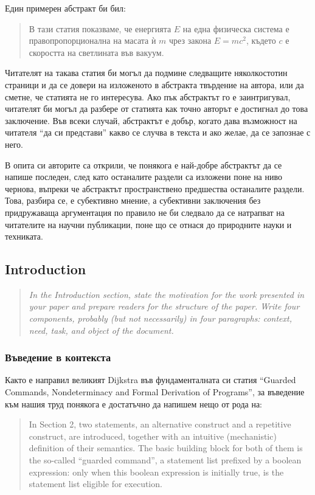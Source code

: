 \documentclass[11pt, oneside]{article}     %
\newenvironment{quotenature}{\begin{quote}\itshape}{\cite{nature}\end{quote}}
\begin{document}
Един примерен абстракт би бил:
\begin{quote}
  В тази статия показваме, че енергията $E$ на една физическа система е правопропорционална на масата ѝ $m$ чрез закона $E=mc^2$, където $c$ е скоростта на светлината във вакуум.
\end{quote}
Читателят на такава статия би могъл да подмине следващите няколкостотин страници и да се довери на изложеното в абстракта твърдение на автора, или да сметне, че статията не го интересува. Ако пък абстрактът го е заинтригувал, читателят би могъл да разбере от статията как точно авторът е достигнал до това заключение. Във всеки случай, абстрактът е добър, когато дава възможност на читателя ``да си представи'' какво се случва в текста и ако желае, да се запознае с него.

В опита си авторите са открили, че понякога е най-добре абстрактът да се напише последен, след като останалите раздели са изложени поне на ниво чернова, въпреки че абстрактът пространствено предшества останалите раздели. Това, разбира се, е субективно мнение, а субективни заключения без придружаваща аргументация по правило не би следвало да се натрапват на читателите на научни публикации, поне що се отнася до природните науки и техниката.

\subsection*{Introduction}

\begin{quotenature}
  In the Introduction section, state the motivation for the work presented in your paper and prepare readers for the structure of the paper. Write four components, probably (but not necessarily) in four paragraphs: context, need, task, and object of the document.
\end{quotenature}

\subsubsection*{Въведение в контекста}

Както е направил великият Dijkstra във фундаменталната си статия ``Guarded Commands, Nondeterminacy and Formal Derivation of Programs'', за въведение към нашия труд понякога е достатъчно да напишем нещо от рода на:
\begin{quote}
  In Section 2, two statements, an alternative construct and a repetitive construct, are introduced, together with an intuitive (mechanistic) definition of their semantics. The basic building block for both of them is the so-called ``guarded command'', a statement list prefixed by a boolean expression: only when this boolean expression is initially true, is the statement list eligible for execution. \cite{dijderive}
\end{quote}
\end{document}
